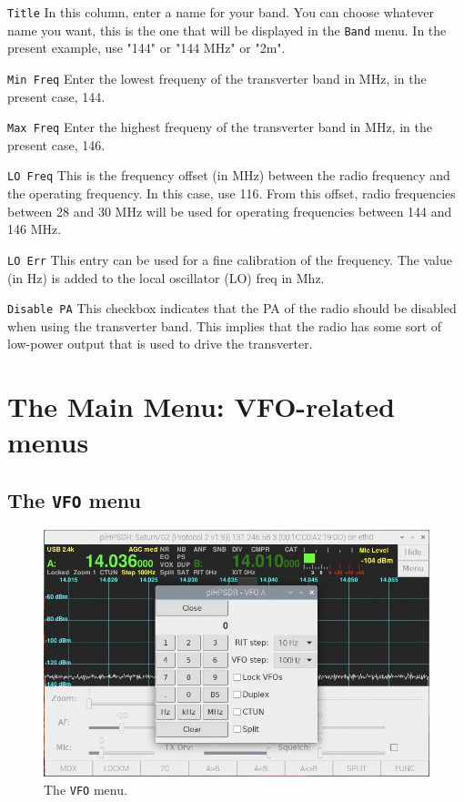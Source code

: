 \documentclass[12pt]{book}
\def\rett#1{\texttt{\color{red}#1}}
\def\bltt#1{\texttt{\color{blue}#1}}
\begin{document}
\rett{Title} In this column, enter a name for your band. You can choose
whatever name you want, this is the one that will be displayed in the
\bltt{Band} menu. In the present example, use "144" or "144 MHz" or "2m".

\rett{Min Freq} Enter the lowest frequeny of the transverter band in MHz,
in the present case, 144.

\rett{Max Freq} Enter the highest frequeny of the transverter band in MHz,
in the present case, 146.

\rett{LO Freq} This is the frequency offset (in MHz) between the radio frequency and
the operating frequency. In this case, use 116. From this offset, radio frequencies
between 28 and 30 MHz will be used for operating frequencies between 144 and 146 MHz.

\rett{LO Err} This entry can be used for a fine calibration of the frequency. The value
(in Hz) is added to the local oscillator (LO) freq in Mhz.

\rett{Disable PA} This checkbox indicates that the PA of the radio should be disabled
when using the transverter band. This implies that the radio has some sort of 
low-power output that is used to drive the transverter.




\chapter{The Main Menu: VFO-related menus}

\section{The \texttt{VFO}  menu}
\begin{figure}[h]
\includegraphics[width=12cm]{VFOmenu.png}
\caption{The \bltt{VFO} menu.}
\label{fig:VFOmenu}
\end{figure}
\end{document}
